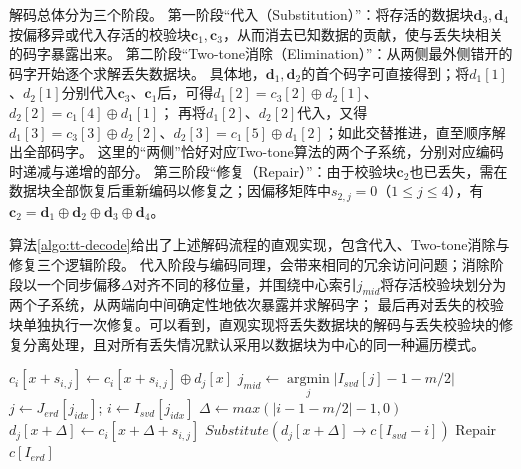 解码总体分为三个阶段。
第一阶段“代入（Substitution）”：将存活的数据块$\boldsymbol{d}_3,\boldsymbol{d}_4$按偏移异或代入存活的校验块$\boldsymbol{c}_1,\boldsymbol{c}_3$，从而消去已知数据的贡献，使与丢失块相关的码字暴露出来。
第二阶段“Two-tone消除（Elimination）”：从两侧最外侧错开的码字开始逐个求解丢失数据块。
具体地，$\boldsymbol{d}_1,\boldsymbol{d}_2$的首个码字可直接得到；将$d_1[1]$、$d_2[1]$分别代入$\boldsymbol{c}_3$、$\boldsymbol{c}_1$后，可得$d_1[2]=c_3[2]\oplus d_2[1]$、$d_2[2]=c_1[4]\oplus d_1[1]$；
再将$d_1[2]$、$d_2[2]$代入，又得$d_1[3]=c_3[3]\oplus d_2[2]$、$d_2[3]=c_1[5]\oplus d_1[2]$；如此交替推进，直至顺序解出全部码字。
这里的“两侧”恰好对应Two-tone算法的两个子系统，分别对应编码时递减与递增的部分。
第三阶段“修复（Repair）”：由于校验块$\boldsymbol{c}_2$也已丢失，需在数据块全部恢复后重新编码以修复之；因偏移矩阵中$s_{2,j}=0$（$1\le j\le 4$），有$\boldsymbol{c}_2=\boldsymbol{d}_1\oplus\boldsymbol{d}_2\oplus\boldsymbol{d}_3\oplus\boldsymbol{d}_4$。


算法\ref{algo:tt-decode}给出了上述解码流程的直观实现，包含代入、Two-tone消除与修复三个逻辑阶段。
代入阶段与编码同理，会带来相同的冗余访问问题；消除阶段以一个同步偏移$\Delta$对齐不同的移位量，并围绕中心索引$j_{mid}$将存活校验块划分为两个子系统，从两端向中间确定性地依次暴露并求解码字；
最后再对丢失的校验块单独执行一次修复。可以看到，直观实现将丢失数据块的解码与丢失校验块的修复分离处理，且对所有丢失情况默认采用以数据块为中心的同一种遍历模式。

\begin{algorithm}[htbp]
\small
\caption{\textsc{Two-tone Decoding}}
\label{algo:tt-decode}
 {
     {
         {
            $c_i[x+s_{i,j}] \gets c_i[x+s_{i,j}] \oplus d_j[x]$\;
        }
    }
}
$j_{mid}\gets\mathop{argmin}\limits_j|I_{svd}[j]-1-m/2|$\;
 {
     {
        $j \gets J_{erd}[j_{idx}]$; $i \gets I_{svd}[j_{idx}]$\;
        $\Delta\gets max(|i-1-m/2| - 1, 0)$\;
        $d_j[x+\Delta]\gets c_i[x+\Delta+s_{i,j}]$\;
        $Substitute(d_j[x+\Delta] \rightarrow c[I_{svd}-i])$\;
    }
}
Repair $c[I_{erd}]$\;
\end{algorithm}

